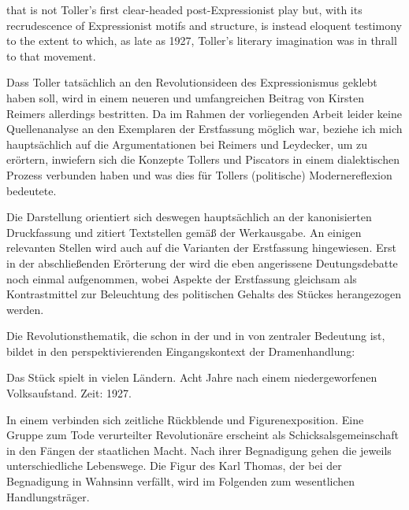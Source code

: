 \begin{BlockQuote}
  that \Cite{Hoppla, wir leben!} is not Toller's first clear-headed
  post-Expressionist play but, with its recrudescence of Expressionist
  motifs and structure, is instead eloquent testimony to the extent to
  which, as late as 1927, Toller's literary imagination was in thrall to
  that movement. 
\end{BlockQuote}
Dass Toller tatsächlich \Cite{sklavisch} an den Revolutionsideen des
Expressionismus geklebt haben soll, wird in einem neueren und umfangreichen
Beitrag von Kirsten Reimers allerdings
bestritten. 
Da im Rahmen der vorliegenden Arbeit
leider keine Quellenanalyse an den Exemplaren der Erstfassung möglich war,
beziehe ich mich hauptsächlich auf die Argumentationen bei Reimers und
Leydecker, um zu erörtern, inwiefern sich die Konzepte Tollers und
Piscators in einem dialektischen Prozess verbunden haben und was dies für
Tollers (politische) Modernereflexion bedeutete.

Die Darstellung orientiert sich deswegen hauptsächlich an der kanonisierten
Druckfassung und zitiert Textstellen gemäß der Werkausgabe. An einigen
relevanten Stellen wird auch auf die Varianten der Erstfassung hingewiesen.  
Erst in der abschließenden Erörterung der  wird
die eben angerissene Deutungsdebatte noch einmal aufgenommen, wobei
Aspekte der Erstfassung gleichsam als Kontrastmittel zur Beleuchtung des
politischen Gehalts des Stückes herangezogen werden. 


Die Revolutionsthematik, die schon in der  und in  von zentraler Bedeutung ist, bildet in  den
perspektivierenden Eingangskontext der Dramenhandlung:

\begin{BlockQuote}
  Das Stück spielt in vielen Ländern. Acht Jahre nach einem niedergeworfenen
  Volksaufstand. Zeit: 1927. 
\end{BlockQuote}
In einem \Cite{Vorspiel} verbinden sich zeitliche Rückblende und
Figurenexposition. Eine Gruppe zum Tode verurteilter Revolutionäre erscheint
als Schicksalsgemeinschaft in den Fängen der staatlichen Macht. Nach ihrer
Begnadigung gehen die \Cite{Genossen} jeweils unterschiedliche Lebenswege. Die
Figur des Karl Thomas, der bei der Begnadigung in Wahnsinn verfällt, wird im
Folgenden zum wesentlichen Handlungsträger.

